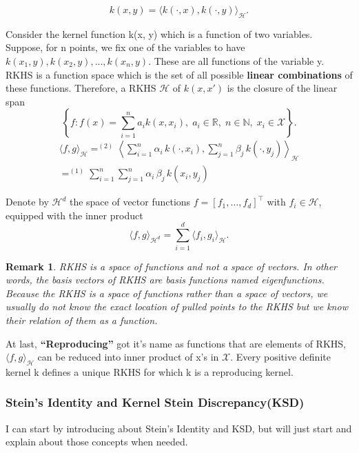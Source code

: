 \documentclass{article}
\newtheorem{remark}[theorem]{Remark}
\begin{document}
\begin{equation}
    k(x, y) = \langle k(\cdot, x), k(\cdot, y) \rangle_{\mathcal{H}}.
\end{equation}

Consider the kernel function k(x, y) which is a function of two variables. Suppose, for n points, we fix one of the variables to have $k(x_{1}, y), k(x_{2}, y), . . . , k(x_{n}, y)$. These are all functions of the variable y. RKHS is a function space which is the set of all possible \textbf{linear combinations} of these functions. Therefore, a RKHS $\mathcal{H}$ of $k(x, x')$ is the closure of the linear span
\begin{equation}
    \left\{ f : f(x) = \sum_{i=1}^n a_i k(x, x_i), \; a_i \in \mathbb{R}, \; n \in \mathbb{N}, \; x_i \in \mathcal{X} \right\}.
\end{equation}
\begin{align*}
\langle f, g \rangle_{\mathcal{H}}
=^{(2)} \left\langle \sum_{i=1}^{n} \alpha_i \, k(\cdot, x_i), \sum_{j=1}^{n} \beta_j \, k(\cdot, y_j) \right\rangle_{\mathcal{H}} \\
= ^{(1)}\sum_{i=1}^{n} \sum_{j=1}^{n} \alpha_i \, \beta_j \, k(x_i, y_j)
\end{align*}

Denote by $\mathcal{H}^d$ the space of vector functions $f = [f_1, \dots, f_d]^{\top}$ with $f_i \in \mathcal{H}$, equipped with the inner product
\[
    \langle f, g \rangle_{\mathcal{H}^d} = \sum_{i=1}^d \langle f_i, g_i \rangle_{\mathcal{H}}.
\]
\begin{tcolorbox}
\begin{remark}
RKHS is a space of functions and not a space of vectors. In other words, the basis vectors of RKHS are basis functions named eigenfunctions. Because the RKHS is a space of functions rather than a space of vectors, we usually do not know the exact location of pulled points to the RKHS but we know their relation of them as a function.  
\end{remark}
\end{tcolorbox}

At last, \textbf{``Reproducing''} got it's name as functions that are elements of RKHS, $\langle f, g \rangle_{\mathcal{H}}$ can be reduced into inner product of x's in $\mathcal{X}$. Every positive definite kernel k defines a unique RKHS for which k is a reproducing kernel.


\subsubsection{Stein’s Identity and Kernel Stein Discrepancy(KSD)}
I can start by introducing about Stein's Identity and KSD, but will just start and explain about those concepts when needed.
\end{document}

